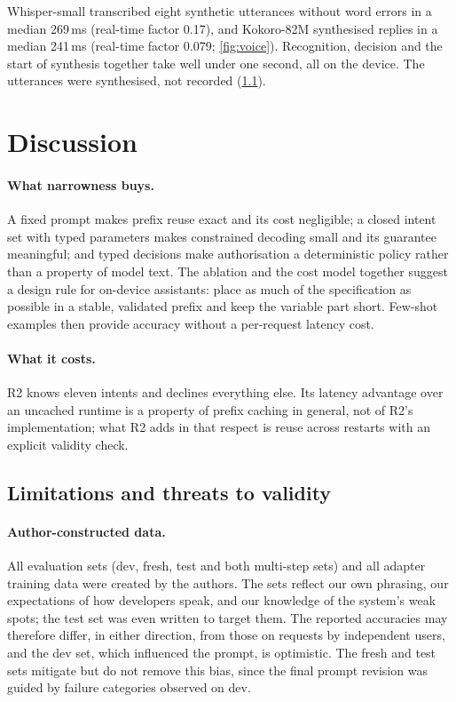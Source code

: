 \documentclass[10pt,twocolumn,letterpaper]{article}
\theoremstyle{definition}
\begin{document}
Whisper-small transcribed eight synthetic utterances without word errors in a median 269\,ms
(real-time factor 0.17), and Kokoro-82M synthesised replies in a median 241\,ms (real-time factor
0.079; \cref{fig:voice}). Recognition, decision and the start of synthesis together take well under
one second, all on the device. The utterances were synthesised, not recorded (\cref{sec:limits}).

\section{Discussion}\label{sec:discussion}

\paragraph{What narrowness buys.}
A fixed prompt makes prefix reuse exact and its cost negligible; a closed intent set with typed
parameters makes constrained decoding small and its guarantee meaningful; and typed decisions make
authorisation a deterministic policy rather than a property of model text. The ablation and the cost
model together suggest a design rule for on-device assistants: place as much of the specification as
possible in a stable, validated prefix and keep the variable part short. Few-shot examples then
provide accuracy without a per-request latency cost.

\paragraph{What it costs.}
R2 knows eleven intents and declines everything else. Its latency advantage over an uncached
runtime is a property of prefix caching in general, not of R2's implementation; what R2 adds in that
respect is reuse across restarts with an explicit validity check.

\subsection{Limitations and threats to validity}\label{sec:limits}

\paragraph{Author-constructed data.}
All evaluation sets (dev, fresh, test and both multi-step sets) and all adapter training data were
created by the authors. The sets reflect our own phrasing, our expectations of how developers speak,
and our knowledge of the system's weak spots; the test set was even written to target them. The
reported accuracies may therefore differ, in either direction, from those on requests by independent
users, and the dev set, which influenced the prompt, is optimistic. The fresh and test sets mitigate
but do not remove this bias, since the final prompt revision was guided by failure categories
observed on dev.
\end{document}
